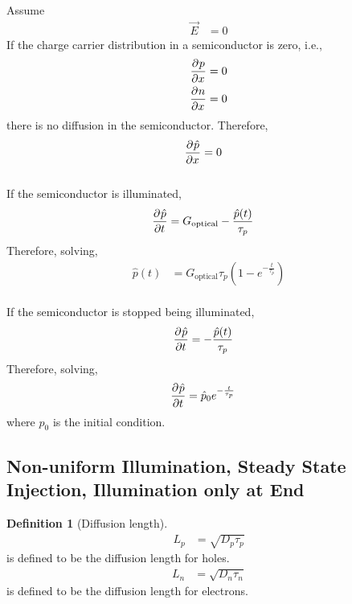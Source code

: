 \documentclass[titlepage, fleqn, a4paper, 12pt, twoside]{article}
\theoremstyle{definition}
\newtheorem{definition}{Definition}
\theoremstyle{theorem}
\begin{document}
Assume
\begin{align*}
	\overrightarrow{E} &= 0
\end{align*}
If the charge carrier distribution in a semiconductor is zero, i.e.,
\begin{align*}
	\dpd{p}{x} &= 0\\
	\dpd{n}{x} &= 0
\end{align*}
there is no diffusion in the semiconductor.
Therefore,
\begin{align*}
	\dpd{\hat{p}}{x} &= 0
\end{align*}
~\\
If the semiconductor is illuminated,
\begin{align*}
	\dpd{\hat{p}}{t} &= G_{\text{optical}} - \frac{\hat{p}(t)}{\tau_p}
\end{align*}
Therefore, solving,
\begin{align*}
	\hat{p}(t) &= G_{\text{optical}} \tau_{p} \left( 1 - e^{-\frac{t}{\tau_p}} \right)
\end{align*}
~\\
If the semiconductor is stopped being illuminated,
\begin{align*}
	\dpd{\hat{p}}{t} &= -\frac{\hat{p}(t)}{\tau_p}
\end{align*}
Therefore, solving,
\begin{align*}
	\dpd{\hat{p}}{t} &= \hat{p}_0 e^{-\frac{t}{\tau_p}}
\end{align*}
where $\hat{p}_0$ is the initial condition.

\subsection{Non-uniform Illumination, Steady State Injection, Illumination only at End}

\begin{definition}[Diffusion length]
	\begin{align*}
		L_p &= \sqrt{D_p \tau_p}
	\end{align*}
	is defined to be the diffusion length for holes.
	\begin{align*}
		L_n &= \sqrt{D_n \tau_n}
	\end{align*}
	is defined to be the diffusion length for electrons.
\end{definition}
\end{document}
